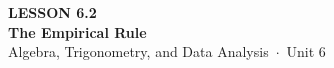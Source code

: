\documentclass[aspectratio=169, 11pt]{beamer}
\begin{document}
{
\begin{frame}[plain]
  \vspace{2.8cm}\hspace{0.55cm}%
  \begin{minipage}{0.9\textwidth}
    {\color{goldacc}\bfseries\small LESSON 6.2}\\[0.5cm]
    {\color{white}\bfseries\LARGE The Empirical Rule}\\[1.2cm]
    {\color{mistmid}\small Algebra, Trigonometry, and Data Analysis~$\cdot$~Unit 6}
  \end{minipage}
\end{frame}
}

\begin{frame}[t, plain]
\end{frame}
\end{document}
